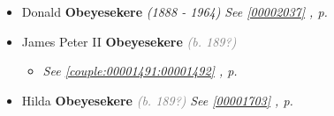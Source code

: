 \documentclass[10pt, openany]{book}
\begin{document}
\begin{itemize}
{\begin{itemize}
\item{Donald \textbf{Obeyesekere} \textcolor{slorange}{\textit{(1888 - 1964)}} \textcolor{slteal}{\textit{See  \autoref{00002037} \textit{, p. \pageref{00002037} }}}}
\item{James Peter II \textbf{Obeyesekere} \textcolor{gray}{\textit{(b. 189?)}}
\begin{itemize}
\item{\textcolor{slteal}{\textit{See  \autoref{couple:00001491:00001492} \textit{, p. \pageref{couple:00001491:00001492} }}}}
\end{itemize}
   }
\item{Hilda \textbf{Obeyesekere} \textcolor{gray}{\textit{(b. 189?)}} \textcolor{slteal}{\textit{See  \autoref{00001703} \textit{, p. \pageref{00001703} }}}}
\end{itemize}}
\end{itemize}
   
\end{document}
